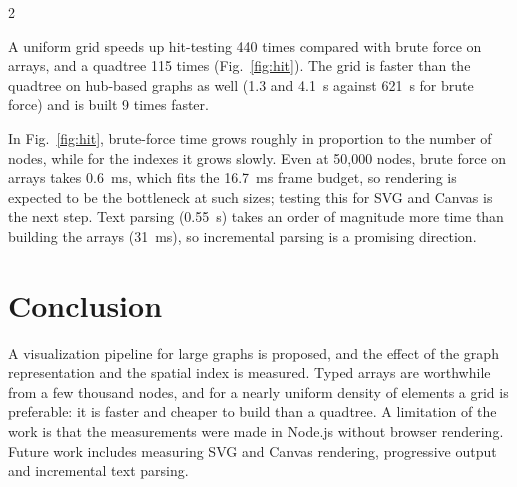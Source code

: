 \documentclass[a4paper,10pt,twoside]{article}
\begin{document}
\begin{multicols}{2}

A uniform grid speeds up hit-testing 440 times compared with brute force on arrays, and a quadtree 115 times (Fig.~\ref{fig:hit}). The grid is faster than the quadtree on hub-based graphs as well (1.3 and 4.1~\textmu s against 621~\textmu s for brute force) and is built 9 times faster.


In Fig.~\ref{fig:hit}, brute-force time grows roughly in proportion to the number of nodes, while for the indexes it grows slowly. Even at 50,000 nodes, brute force on arrays takes 0.6~ms, which fits the 16.7~ms frame budget, so rendering is expected to be the bottleneck at such sizes; testing this for SVG and Canvas is the next step. Text parsing (0.55~s) takes an order of magnitude more time than building the arrays (31~ms), so incremental parsing is a promising direction.

\section*{Conclusion}
A visualization pipeline for large graphs is proposed, and the effect of the graph representation and the spatial index is measured. Typed arrays are worthwhile from a few thousand nodes, and for a nearly uniform density of elements a grid is preferable: it is faster and cheaper to build than a quadtree. A limitation of the work is that the measurements were made in Node.js without browser rendering. Future work includes measuring SVG and Canvas rendering, progressive output and incremental text parsing.


\end{multicols}
\end{document}
